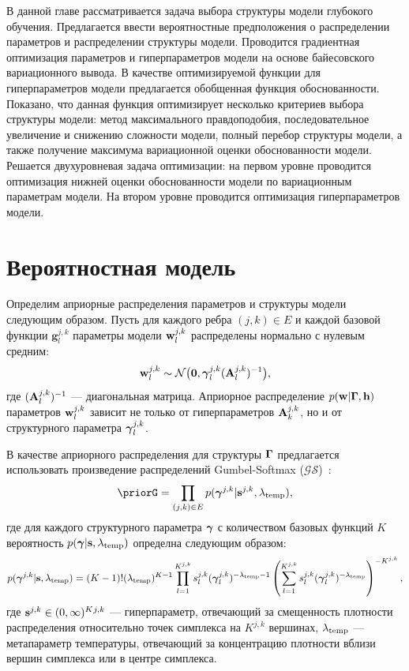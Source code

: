 В данной главе рассматривается задача выбора структуры модели глубокого обучения. Предлагается ввести вероятностные предположения о распределении параметров и распределении структуры модели. 
Проводится градиентная оптимизация параметров и гиперпараметров модели на основе байесовского вариационного вывода.  В качестве оптимизируемой функции для гиперпараметров модели предлагается обобщенная функция обоснованности. Показано, что данная функция оптимизирует несколько критериев выбора структуры модели: метод максимального правдоподобия, последовательное увеличение и снижению сложности модели, полный перебор структуры модели, а также получение максимума вариационной оценки обоснованности модели. Решается двухуровневая задача оптимизации: на первом уровне проводится оптимизация нижней оценки обоснованности модели по вариационным параметрам модели. На втором уровне проводится оптимизация гиперпараметров модели.

\section{Вероятностная модель}
Определим априорные распределения параметров и структуры модели следующим образом.
Пусть для каждого ребра $(j,k) \in E$ и каждой базовой функции $\mathbf{g}^{j,k}_l$ параметры модели $\mathbf{w}^{j,k}_l$ распределены нормально с нулевым средним:
\[
    \mathbf{w}^{j,k}_l \sim \mathcal{N}\bigl(\mathbf{0}, \boldsymbol{\gamma}^{j,k}_l(\mathbf{A}^{j,k}_l)^{-1}\bigr),
\]
где $ (\mathbf{A}^{j,k}_l)^{-1}$ --- диагональная матрица. Априорное распределение $p(\mathbf{w}|\boldsymbol{\Gamma}, \mathbf{h})$ параметров $\mathbf{w}^{j,k}_l$ зависит не только от гиперпараметров $\mathbf{A}_k^{j,k}$, но и от структурного параметра $\boldsymbol{\gamma}^{j,k}_l$.


В качестве априорного распределения для структуры $\boldsymbol{\Gamma}$ предлагается использовать произведение распределений Gumbel-Softmax ($\mathcal{GS}$)~\cite{gs}:
\[
    \priorG = \prod_{(j,k) \in E} p(\g^{j,k}|\s^{j,k}, \lamT),
\]
где для каждого структурного параметра $\boldsymbol{\gamma}$ с количеством базовых функций $K$ вероятность $p(\boldsymbol{\gamma}|\mathbf{s}, \lambda_{\text{temp}})$ определна следующим образом:
\[
    p(\boldsymbol{\gamma}^{j,k}|\mathbf{s}, \lambda_{\text{temp}}) = (K-1)!(\lambda_{\text{temp}})^{K-1}\prod_{l=1}^{K^{j,k}} s^{j,k}_l(\boldsymbol{\gamma}^{j,k}_l)^{-\lambda_{\text{temp}} -1} \left(\sum_{l=1}^{K^{j,k}} s^{j,k}_l(\boldsymbol{\gamma}^{j,k}_l)^{-\lambda_{\text{temp}}}\right)^{-K^{j,k}},
\]
где $\mathbf{s}^{j,k} \in (0,\infty)^K{^{j,k}}$ --- гиперпараметр, отвечающий за смещенность плотности распределения относительно точек симплекса на $K^{j,k}$ вершинах, $\lambda_{\text{temp}}$ --- метапараметр температуры, отвечающий за концентрацию плотности вблизи вершин симплекса или в центре симплекса.

